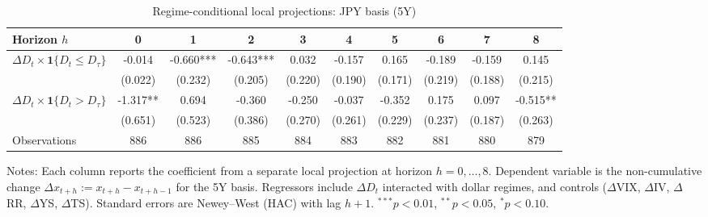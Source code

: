 \begin{table}[!htbp]\centering
\caption{Regime-conditional local projections: JPY basis (5Y)}
\label{tab:lp_jpy_5y}
\begin{tabular}{lccccccccc}
\toprule
Horizon $h$ & 0 & 1 & 2 & 3 & 4 & 5 & 6 & 7 & 8 \\
\midrule
$\Delta D_t \times \mathbf{1}\{D_t \le D_\tau\}$ & -0.014 & -0.660*** & -0.643*** & 0.032 & -0.157 & 0.165 & -0.189 & -0.159 & 0.145 \\
  & (0.022) & (0.232) & (0.205) & (0.220) & (0.190) & (0.171) & (0.219) & (0.188) & (0.215) \\
$\Delta D_t \times \mathbf{1}\{D_t > D_\tau\}$ & -1.317** & 0.694 & -0.360 & -0.250 & -0.037 & -0.352 & 0.175 & 0.097 & -0.515** \\
  & (0.651) & (0.523) & (0.386) & (0.270) & (0.261) & (0.229) & (0.237) & (0.187) & (0.263) \\
\midrule
Observations & 886 & 886 & 885 & 884 & 883 & 882 & 881 & 880 & 879 \\
\bottomrule
\end{tabular}
\begin{flushleft}\footnotesize Notes: Each column reports the coefficient from a separate local projection at horizon $h=0,\dots,8$. Dependent variable is the non-cumulative change $\Delta x_{t+h}:=x_{t+h}-x_{t+h-1}$ for the 5Y basis. Regressors include $\Delta D_t$ interacted with dollar regimes, and controls ($\Delta$VIX, $\Delta$IV, $\Delta$RR, $\Delta$YS, $\Delta$TS). Standard errors are Newey--West (HAC) with lag $h+1$. $^{***}p<0.01$, $^{**}p<0.05$, $^{*}p<0.10$.\end{flushleft}
\end{table}